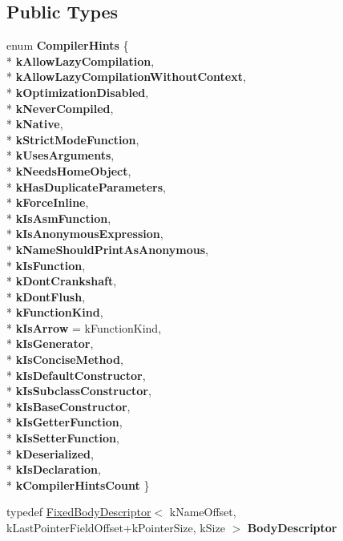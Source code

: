 \subsection*{Public Types}
\begin{DoxyCompactItemize}
\item 
enum {\bfseries Compiler\+Hints} \{ \\*
{\bfseries k\+Allow\+Lazy\+Compilation}, 
\\*
{\bfseries k\+Allow\+Lazy\+Compilation\+Without\+Context}, 
\\*
{\bfseries k\+Optimization\+Disabled}, 
\\*
{\bfseries k\+Never\+Compiled}, 
\\*
{\bfseries k\+Native}, 
\\*
{\bfseries k\+Strict\+Mode\+Function}, 
\\*
{\bfseries k\+Uses\+Arguments}, 
\\*
{\bfseries k\+Needs\+Home\+Object}, 
\\*
{\bfseries k\+Has\+Duplicate\+Parameters}, 
\\*
{\bfseries k\+Force\+Inline}, 
\\*
{\bfseries k\+Is\+Asm\+Function}, 
\\*
{\bfseries k\+Is\+Anonymous\+Expression}, 
\\*
{\bfseries k\+Name\+Should\+Print\+As\+Anonymous}, 
\\*
{\bfseries k\+Is\+Function}, 
\\*
{\bfseries k\+Dont\+Crankshaft}, 
\\*
{\bfseries k\+Dont\+Flush}, 
\\*
{\bfseries k\+Function\+Kind}, 
\\*
{\bfseries k\+Is\+Arrow} = k\+Function\+Kind, 
\\*
{\bfseries k\+Is\+Generator}, 
\\*
{\bfseries k\+Is\+Concise\+Method}, 
\\*
{\bfseries k\+Is\+Default\+Constructor}, 
\\*
{\bfseries k\+Is\+Subclass\+Constructor}, 
\\*
{\bfseries k\+Is\+Base\+Constructor}, 
\\*
{\bfseries k\+Is\+Getter\+Function}, 
\\*
{\bfseries k\+Is\+Setter\+Function}, 
\\*
{\bfseries k\+Deserialized}, 
\\*
{\bfseries k\+Is\+Declaration}, 
\\*
{\bfseries k\+Compiler\+Hints\+Count}
 \}\hypertarget{classv8_1_1internal_1_1_shared_function_info_a48ecd0019baf04d0631d1a555683e585}{}\label{classv8_1_1internal_1_1_shared_function_info_a48ecd0019baf04d0631d1a555683e585}

\item 
typedef \hyperlink{classv8_1_1internal_1_1_fixed_body_descriptor}{Fixed\+Body\+Descriptor}$<$ k\+Name\+Offset, k\+Last\+Pointer\+Field\+Offset+k\+Pointer\+Size, k\+Size $>$ {\bfseries Body\+Descriptor}\hypertarget{classv8_1_1internal_1_1_shared_function_info_a1fc917341336c4822c70f16618f04586}{}\label{classv8_1_1internal_1_1_shared_function_info_a1fc917341336c4822c70f16618f04586}

\end{DoxyCompactItemize}
